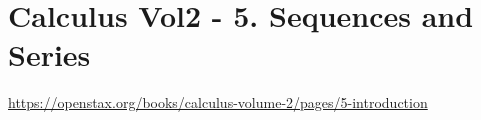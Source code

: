 \section{Calculus Vol2 - 5. Sequences and Series}

\url{https://openstax.org/books/calculus-volume-2/pages/5-introduction}

\clearpage
\clearpage
\clearpage
\clearpage
\clearpage
\clearpage
